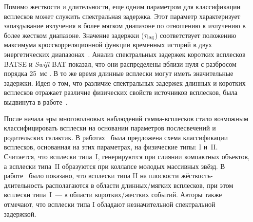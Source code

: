 Помимо жесткости и длительности, еще одним параметром для классификации всплесков 
может служить спектральная задержка. Этот параметр характеризует запаздывание 
излучения в более мягком диапазоне по отношению к излучению в более жестком диапазоне. 
Значение задержки ($\tau_{\mathrm{lag}}$) соответствует положению  максимума 
кросскорреляционной функции временных историй в двух энергетических диапазонах~\citep{Norris_2000}. 
Анализ спектральных задержек коротких всплесков BATSE и \textit{Swift}-BAT показал, 
что они распределены вблизи нуля с разбросом 
порядка 25~мс \citep{Norris_and_Bonnel_2006ApJ, Norris_2011ApJ}. В то же время длинные 
всплески могут иметь значительные задержки. Идея о том, что различие спектральных 
задержек длинных и коротких всплесков отражает различие физических свойств источников 
всплесков, была выдвинута в работе~\citep{Gehrels_2006_Nature}.


После начала эры многоволновых наблюдений гамма-всплесков стало возможным 
классифицировать всплески на основании параметров послесвечений и родительских галактик. 
В работах~\citep{Zhang_2006, Zhang_2007, Zhang_2009} была предложена схема классификации всплесков, 
основанная на этих параметрах, на физические типы: I и~II. Считается, что всплески типа~I, 
генерируются при слиянии компактных объектов, а всплески типа~II образуются 
при коллапсе молодых массивных звёзд. В работе~\citep{Zhang_2009} было показано, 
что всплески типа II на плоскости жёсткость-длительность располагаются в области 
длинных/мягких всплесков, при этом всплески типа~I~--- в области коротких/жестких событий. 
Авторы также отмечают, что всплески типа I обладают незначительной спектральной задержкой.

